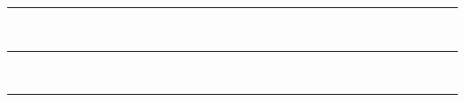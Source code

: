 \documentclass[a4paper]{article}
\newcommand{\fullrule}[1]{\noindent\rule{\textwidth}{#1}}
\def\stdfullrule{\fullrule{0.4pt}}
\begin{document}
\thispagestyle{empty}

\begin{center}


\stdfullrule
\end{center}



\



\stdfullrule

\



\stdfullrule

\

\end{document}
